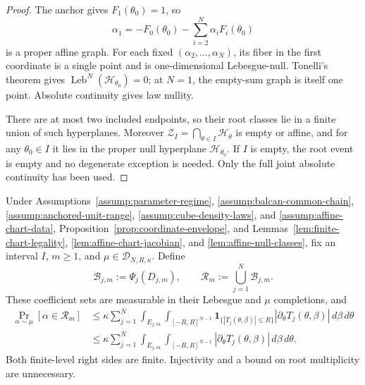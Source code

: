 \begin{proof}
The anchor gives $F_1(\theta_0)=1$, so
\[
\alpha_1=-F_0(\theta_0)-\sum_{i=2}^N\alpha_iF_i(\theta_0)
\]
is a proper affine graph.  For each fixed
$(\alpha_2,\ldots,\alpha_N)$, its fiber in the first coordinate is a single
point and is one-dimensional Lebesgue-null.  Tonelli's theorem
\citep{bogachev2007measure} gives
$\operatorname{Leb}^N(\mathcal H_{\theta_0})=0$; at $N=1$, the empty-sum
graph is itself one point.  Absolute continuity gives law nullity.

There are at most two included endpoints, so their root classes lie in a
finite union of such hyperplanes.  Moreover
$\mathcal Z_I=\bigcap_{\theta\in I}\mathcal H_\theta$ is empty or affine,
and for any $\theta_0\in I$ it lies in the proper null hyperplane
$\mathcal H_{\theta_0}$.  If $I$ is empty, the root event is empty and no
degenerate exception is needed.  Only the full joint absolute continuity has
been used.
\end{proof}

\begin{proposition}
\label{prop:finite-chart-area}
Under Assumptions~\ref{assump:parameter-regime},
\ref{assump:balcan-common-chain},
\ref{assump:anchored-unit-range},
\ref{assump:cube-density-laws}, and
\ref{assump:affine-chart-data}, Proposition~\ref{prop:coordinate-envelope},
and Lemmas~\ref{lem:finite-chart-legality},
\ref{lem:affine-chart-jacobian}, and
\ref{lem:affine-null-classes}, fix an interval $I$, $m\geq1$, and
$\mu\in\mathcal D_{N,R,\kappa}$.  Define
\[
\mathcal B_{j,m}:=\Psi_j(D_{j,m}),
\qquad
\mathcal R_m:=\bigcup_{j=1}^N\mathcal B_{j,m}.
\]
These coefficient sets are measurable in their Lebesgue and $\mu$
completions, and
\begin{equation}
\begin{aligned}
\Pr_{\alpha\sim\mu}[\alpha\in\mathcal R_m]
&\leq\kappa\sum_{j=1}^N
\int_{E_{j,m}}\int_{[-R,R]^{N-1}}
\mathbf1_{\{|T_j(\theta,\beta)|\leq R\}}
|\partial_\theta T_j(\theta,\beta)|
\,d\beta\,d\theta\\
&\leq\kappa\sum_{j=1}^N
\int_{E_{j,m}}\int_{[-R,R]^{N-1}}
|\partial_\theta T_j(\theta,\beta)|
\,d\beta\,d\theta.
\end{aligned}
\label{eq:appendix-34}
\end{equation}
Both finite-level right sides are finite.  Injectivity and a bound on root
multiplicity are unnecessary.
\end{proposition}


